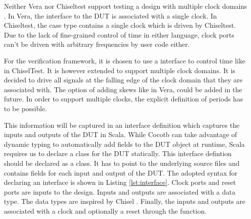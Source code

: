 
Neither Vera nor Chiseltest support testing a design with multiple clock domains \cite[Sec.
7]{flake2020a}\cite{chiseltest_multiclock}. In Vera, the interface to the DUT is associated with a single clock. In
Chiseltest, the  case type contains a single clock which is driven by Chiseltest. Due to the lack of
fine-grained control of time in either language, clock ports can't be driven with arbitrary frequencies by user code either.

For the verification framework, it is chosen to use a  interface to control time like in ChiselTest. It is however extended to support multiple clock domains. It is decided to drive all signals at the falling edge of the clock domain that they are associated with. The option of adding skews like in Vera, could be added in the future. In order to support multiple clocks, the explicit definition of periods has to be possible.

This information will be captured in an interface definition which captures the inputs and outputs of the DUT in Scala. While Cocotb can take advantage of dynamic typing to automatically add fields to the DUT object at runtime, Scala requires us to declare a class for the DUT statically. This interface defintion should be declared as a class. It has to point to the underlying source files and contains fields for each input and output of the DUT. The adopted syntax for declaring an interface is shown in Listing \ref{lst:interface}. Clock ports and reset ports are inputs to the design. Inputs and outputs are associated with a data type. The data types are inspired by Chisel \cite{chiselpaper}. Finally, the inputs and outputs are associated with a clock and optionally a reset through the  function.


